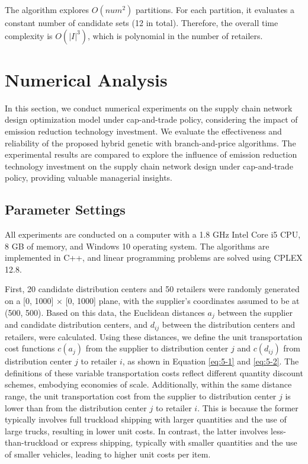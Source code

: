 \documentclass[]{article}
\theoremstyle{plain}%
\theoremstyle{definition}
\theoremstyle{remark}
\theoremstyle{plain}%
\begin{document}
    The algorithm explores $O(num^2)$ partitions. For each partition, it evaluates a constant number of candidate sets (12 in total). Therefore, the overall time complexity is $O(|I|^3)$, which is polynomial in the number of retailers.
    
    \section{Numerical Analysis}
    In this section, we conduct numerical experiments on the supply chain network design optimization model under cap-and-trade policy, considering the impact of emission reduction technology investment. We evaluate the effectiveness and reliability of the proposed hybrid genetic with branch-and-price algorithms. The experimental results are compared to explore the influence of emission reduction technology investment on the supply chain network design under cap-and-trade policy, providing valuable managerial insights. 
    
    \subsection{Parameter Settings}
    All experiments are conducted on a computer with a 1.8 GHz Intel Core i5 CPU, 8 GB of memory, and Windows 10 operating system. The algorithms are implemented in C++, and linear programming problems are solved using CPLEX 12.8. 
    
    First, 20 candidate distribution centers and 50 retailers were randomly generated on a [0, 1000] × [0, 1000] plane, with the supplier's coordinates assumed to be at (500, 500). Based on this data, the Euclidean distances $a_j$ between the supplier and candidate distribution centers, and $d_{ij}$ between the distribution centers and retailers, were calculated. Using these distances, we define the unit transportation cost functions $c(a_j)$ from the supplier  to distribution center $j$ and $c(d_{ij})$ from distribution center $j$ to retailer $i$, as shown in Equation \ref{eq:5-1} and \ref{eq:5-2}. The definitions of these variable transportation costs reflect different quantity discount schemes, embodying economies of scale. Additionally, within the same distance range, the unit transportation cost from the supplier to distribution center $j$ is lower than from the distribution center $j$ to retailer $i$. This is because the former typically involves full truckload shipping with larger quantities and the use of large trucks, resulting in lower unit costs. In contrast, the latter involves less-than-truckload or express shipping, typically with smaller quantities and the use of smaller vehicles, leading to higher unit costs per item.
    
\end{document}
